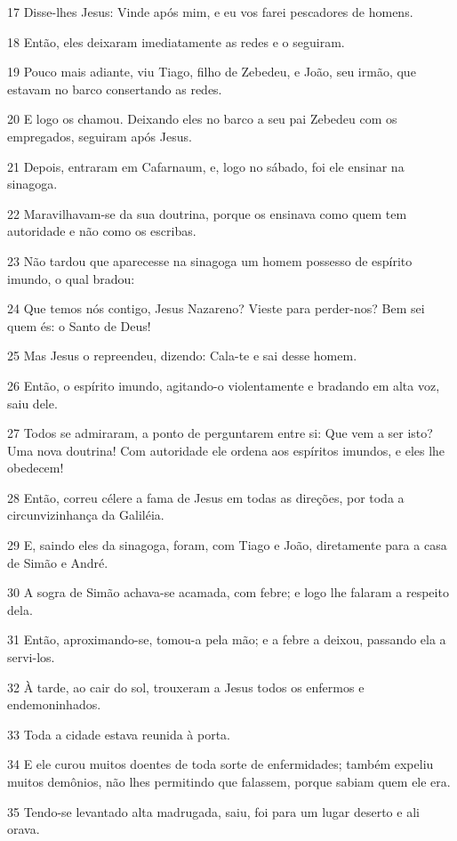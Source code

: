 \par 17 Disse-lhes Jesus: Vinde após mim, e eu vos farei pescadores de homens.
\par 18 Então, eles deixaram imediatamente as redes e o seguiram.
\par 19 Pouco mais adiante, viu Tiago, filho de Zebedeu, e João, seu irmão, que estavam no barco consertando as redes.
\par 20 E logo os chamou. Deixando eles no barco a seu pai Zebedeu com os empregados, seguiram após Jesus.
\par 21 Depois, entraram em Cafarnaum, e, logo no sábado, foi ele ensinar na sinagoga.
\par 22 Maravilhavam-se da sua doutrina, porque os ensinava como quem tem autoridade e não como os escribas.
\par 23 Não tardou que aparecesse na sinagoga um homem possesso de espírito imundo, o qual bradou:
\par 24 Que temos nós contigo, Jesus Nazareno? Vieste para perder-nos? Bem sei quem és: o Santo de Deus!
\par 25 Mas Jesus o repreendeu, dizendo: Cala-te e sai desse homem.
\par 26 Então, o espírito imundo, agitando-o violentamente e bradando em alta voz, saiu dele.
\par 27 Todos se admiraram, a ponto de perguntarem entre si: Que vem a ser isto? Uma nova doutrina! Com autoridade ele ordena aos espíritos imundos, e eles lhe obedecem!
\par 28 Então, correu célere a fama de Jesus em todas as direções, por toda a circunvizinhança da Galiléia.
\par 29 E, saindo eles da sinagoga, foram, com Tiago e João, diretamente para a casa de Simão e André.
\par 30 A sogra de Simão achava-se acamada, com febre; e logo lhe falaram a respeito dela.
\par 31 Então, aproximando-se, tomou-a pela mão; e a febre a deixou, passando ela a servi-los.
\par 32 À tarde, ao cair do sol, trouxeram a Jesus todos os enfermos e endemoninhados.
\par 33 Toda a cidade estava reunida à porta.
\par 34 E ele curou muitos doentes de toda sorte de enfermidades; também expeliu muitos demônios, não lhes permitindo que falassem, porque sabiam quem ele era.
\par 35 Tendo-se levantado alta madrugada, saiu, foi para um lugar deserto e ali orava.
